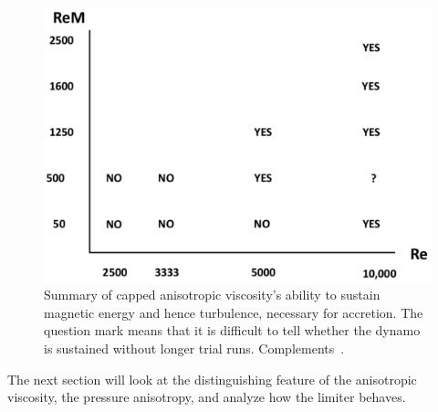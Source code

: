 \begin{figure}[h]
  \begin{center}  
    \includegraphics[width=\textwidth, angle=0.]{img/fromangPlot.pdf}
  \end{center}
  \caption{Summary of capped anisotropic viscosity's ability to sustain magnetic energy and hence turbulence, necessary for accretion. The question mark means that it is difficult to tell whether the dynamo is sustained without longer trial runs. Complements~\citet{Fromang2007b}.}
  \label{fig:fromangPlot}
\end{figure}
\noindent The next section will look at the distinguishing feature of the anisotropic viscosity, the pressure anisotropy, and analyze how the limiter behaves.

